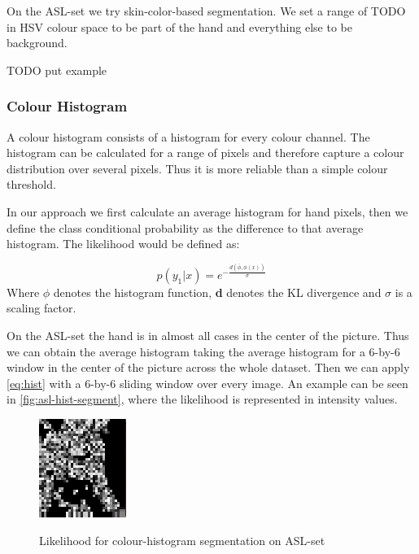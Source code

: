 \documentclass[letterpaper, 10 pt, conference]{ieeeconf}  %
\begin{document}
On the ASL-set we try skin-color-based segmentation. We set a range of TODO in HSV colour space to be part of the hand and everything else to be background.

TODO put example

\subsubsection{Colour Histogram}

A colour histogram consists of a histogram for every colour channel. The histogram can be calculated for a range of pixels and therefore capture a colour distribution over several pixels. Thus it is more reliable than a simple colour threshold.

In our approach we first calculate an average histogram for hand pixels, then we define the class conditional probability as the difference to that average histogram. The likelihood would be defined as:

\begin{equation}
p(y_1 | x) = e^{-\frac{d(\bar{\phi},\phi(x))}{\sigma}}
\label{eq:hist}
\end{equation}
Where $\phi$ denotes the histogram function, \textbf{d} denotes the KL divergence and $\sigma$ is a scaling factor.

On the ASL-set the hand is in almost all cases in the center of the picture. Thus we can obtain the average histogram taking the average histogram for a 6-by-6 window in the center of the picture across the whole dataset. Then we can apply \autoref{eq:hist} with a 6-by-6 sliding window over every image. An example can be seen in \autoref{fig:asl-hist-segment}, where the likelihood is represented in intensity values.

\begin{figure}
\centering
\includegraphics[width=0.4\linewidth]{asl-hist-segment}
\label{fig:asl-hist-segment}
\caption{Likelihood for colour-histogram segmentation on ASL-set}
\end{figure}
\end{document}
